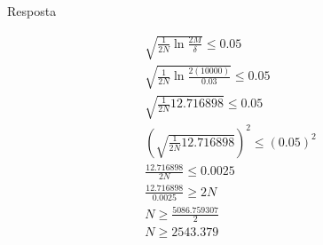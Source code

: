  Resposta

\begin{align*}
	\sqrt{\frac{1}{2N} \ln{\frac{2M}{\delta}}} \le 0.05 \\
	\sqrt{\frac{1}{2N} \ln{\frac{2(10000)}{0.03}}} \le 0.05 \\
	\sqrt{\frac{1}{2N} {12.716898}} \le 0.05 \\
	\left( \sqrt{\frac{1}{2N} {12.716898}} \right) ^ {2} \le (0.05)^{2} \\
	\frac{12.716898}{2N} \le 0.0025 \\
	\frac{12.716898}{0.0025} \ge 2N \\
	N \ge \frac{5086.759307}{2} \\
	N \ge {2543.379} \\
\end{align*}

